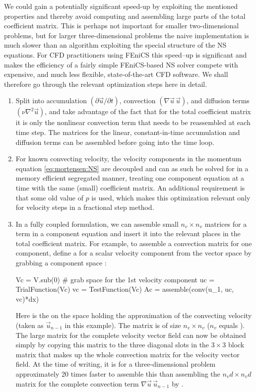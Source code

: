 We could gain a potentially significant speed-up by exploiting the
mentioned properties and thereby avoid computing and assembling large
parts of the total coefficient matrix.
This is perhaps not important for smaller two-dimensional problems,
but for larger three-dimensional problems the naive implementation is
much slower than an algorithm exploiting the special structure of the
NS equations.  For CFD practitioners using FEniCS this speed--up is
significant and makes the efficiency of a fairly simple FEniCS-based NS
solver compete with expensive, and much less flexible, state-of-the-art
CFD software.  We shall therefore go through the relevant optimization
steps here in detail.
\begin{enumerate}
 \item Split  into accumulation $(\partial \vec{u}/\partial t)$,
   convection $(\nabla \vec{u} \, \vec{u})$, and diffusion terms
   $(\nu\nabla^2 \vec{u})$, and take advantage of the fact that for the total
   coefficient matrix it is only the nonlinear convection term that
   needs to be reassembled at each time step. The matrices for the
   linear, constant-in-time accumulation and diffusion terms can be
   assembled before going into the time loop.

\item For known convecting velocity, the velocity components in
  the momentum equation \eqref{eq:mortensen:NS} are decoupled and
  can as such be solved for in a memory efficient segregated manner,
  treating one component equation at a time with the same (small)
  coefficient matrix. An additional requirement is that some old value
  of $p$ is used, which makes this optimization relevant only for
  velocity steps in a fractional step method.

\item In a fully coupled formulation, we can assemble small
  $n_v\times n_v$ matrices for a term in a component equation and
  insert it into the relevant places in the total coefficient matrix.
  For example, to assemble a convection matrix for one component,
  define a  for a scalar velocity component from
  the vector space  by grabbing a component space :
\begin{python}
Vc = V.sub(0)  # grab space for the 1st velocity component
uc = TrialFunction(Vc)
vc = TestFunction(Vc)
Ac = assemble(conv(u_1, uc, vc)*dx)
\end{python}
Here  is the  on the space  holding the
approximation of the convecting velocity (taken as $\vec{u}_{n-1}$ in
this example).  The matrix  is of size $n_v\times n_v$ ($n_v$
equals ).  The large matrix for the complete velocity
vector field can now be obtained simply by copying this 
matrix to the three diagonal slots in the $3\times 3$ block matrix
that makes up the whole convection matrix for the velocity vector
field.  At the time of writing, it is for a three-dimensional problem
approximately 20 times faster to assemble this  than
assembling the $n_vd\times n_vd$ matrix for the complete convection
term $\nabla \vec{u} \, \vec{u}_{n-1}$ by .


\end{enumerate}
